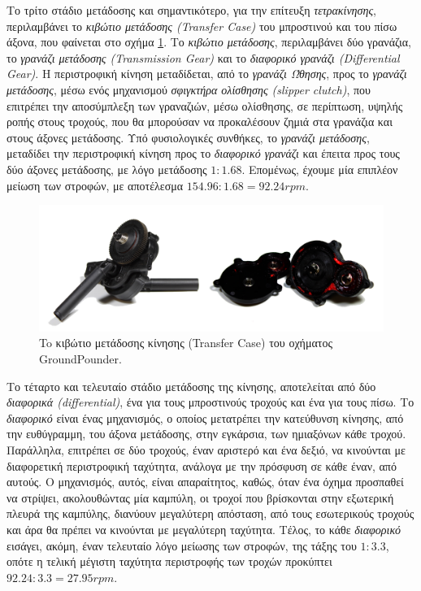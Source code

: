 \bigskip
Το τρίτο στάδιο μετάδοσης και σημαντικότερο, για την επίτευξη \textit{τετρακίνησης}, περιλαμβάνει το \textit{κιβώτιο μετάδοσης (Transfer Case)} του μπροστινού και του πίσω άξονα, που φαίνεται στο σχήμα \ref{fig:transfer_case}. Το \textit{κιβώτιο μετάδοσης}, περιλαμβάνει δύο γρανάζια, το \textit{γρανάζι μετάδοσης (Transmission Gear)} και το \textit{διαφορικό γρανάζι (Differential Gear)}. Η περιστροφική κίνηση μεταδίδεται, από το \textit{γρανάζι Ώθησης}, προς το \textit{γρανάζι μετάδοσης}, μέσω ενός μηχανισμού \textit{σφιγκτήρα ολίσθησης (slipper clutch)}, που επιτρέπει την αποσύμπλεξη των γραναζιών, μέσω ολίσθησης, σε περίπτωση, υψηλής ροπής στους τροχούς, που θα μπορούσαν να προκαλέσουν ζημιά στα γρανάζια και στους άξονες μετάδοσης. Υπό φυσιολογικές συνθήκες, το \textit{γρανάζι μετάδοσης}, μεταδίδει την περιστροφική κίνηση προς το \textit{διαφορικό γρανάζι} και έπειτα προς τους δύο άξονες μετάδοσης, με λόγο μετάδοσης $1:1.68$. Επομένως, έχουμε μία επιπλέον μείωση των στροφών, με αποτέλεσμα $154.96:1.68=92.24rpm$.

\begin{figure}[!ht]
	\centering
	\includegraphics[width=0.8\linewidth]{Chapters/Chapter2/Figures/transfer_case.png}
	\caption{To κιβώτιο μετάδοσης κίνησης (Transfer Case) του οχήματος GroundPounder.}
	\label{fig:transfer_case}
\end{figure}

\bigskip
Το τέταρτο και τελευταίο στάδιο μετάδοσης της κίνησης, αποτελείται από δύο \textit{διαφορικά (differential)}, ένα για τους μπροστινούς τροχούς και ένα για τους πίσω. Το \textit{διαφορικό} είναι ένας μηχανισμός, ο οποίος μετατρέπει την κατεύθυνση κίνησης, από την ευθύγραμμη, του άξονα μετάδοσης, στην εγκάρσια, των ημιαξόνων κάθε τροχού. Παράλληλα, επιτρέπει σε δύο τροχούς, έναν αριστερό και ένα δεξιό, να κινούνται με διαφορετική περιστροφική ταχύτητα, ανάλογα με την πρόσφυση σε κάθε έναν, από αυτούς. Ο μηχανισμός, αυτός, είναι απαραίτητος, καθώς, όταν ένα όχημα προσπαθεί να στρίψει, ακολουθώντας μία καμπύλη, οι τροχοί που βρίσκονται στην εξωτερική πλευρά της καμπύλης, διανύουν μεγαλύτερη απόσταση, από τους εσωτερικούς τροχούς και άρα θα πρέπει να κινούνται με μεγαλύτερη ταχύτητα. Τέλος, το κάθε \textit{διαφορικό} εισάγει, ακόμη, έναν τελευταίο λόγο μείωσης των στροφών, της τάξης του $1:3.3$, οπότε η τελική μέγιστη ταχύτητα περιστροφής των τροχών προκύπτει $92.24:3.3=27.95rpm$.

